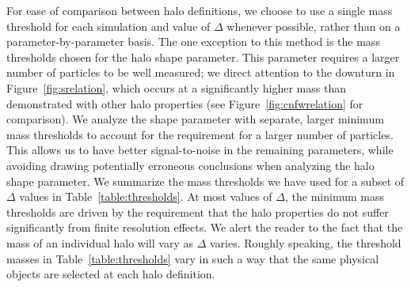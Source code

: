 \documentclass[usenatbib]{mnras}
\begin{document}
For ease of comparison between halo definitions, we choose to use a single mass threshold for each
simulation and value of $\Delta$ whenever possible, rather than on a parameter-by-parameter basis. 
The one exception to this method is the mass thresholds chosen
for the halo shape parameter. This parameter requires a larger number of particles to be
well measured; we direct attention to the downturn in Figure~\ref{fig:srelation}, which occurs at
a significantly higher mass than demonstrated with other halo properties (see Figure~\ref{fig:cnfwrelation}
for comparison). 
We analyze the shape parameter with separate, larger minimum mass thresholds to account for 
the requirement for a larger number of particles. This allows us
to have better signal-to-noise in the remaining parameters, while avoiding drawing potentially
erroneous conclusions when analyzing the halo shape parameter.
We summarize the mass thresholds we have used for a 
subset of $\Delta$ values in Table~\ref{table:thresholds}. 
At most values of $\Delta$, the minimum mass thresholds are 
driven by the requirement that the halo properties do 
not suffer significantly from finite resolution effects. We alert the reader to the fact 
that the mass of an individual halo will vary as $\Delta$ varies. Roughly speaking, 
the threshold masses in Table~\ref{table:thresholds} vary in such a way that the 
same physical objects are selected at each halo definition.


  
\end{document}
